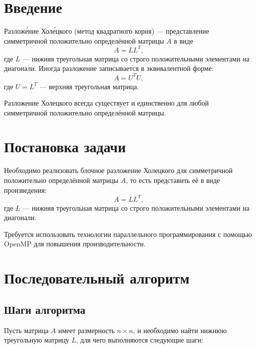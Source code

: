 \documentclass[12pt, russian]{extarticle}
\begin{document}

\begin{spacing}{1.5}

\tableofcontents
\thispagestyle{empty}
\newpage

\pagestyle{plain}
\setcounter{page}{3}


\section{Введение}

Разложе́ние Холе́цкого (метод квадратного корня) — представление симметричной положительно определённой матрицы \( A \) в виде
\[
A = LL^{T},
\]
где \( L \) — нижняя треугольная матрица со строго положительными элементами на диагонали. Иногда разложение записывается в эквивалентной форме:
\[
A = U^{T}U,
\]
где \( U = L^{T} \) — верхняя треугольная матрица.

Разложение Холецкого всегда существует и единственно для любой симметричной положительно определённой матрицы.

\newpage
\section{Постановка задачи}

Необходимо реализовать блочное разложение Холецкого для симметричной положительно определённой матрицы \( A \), то есть представить её в виде произведения:
\[
A = LL^{T},
\]
где \( L \) — нижняя треугольная матрица со строго положительными элементами на диагонали.

Требуется использовать технологии параллельного программирования с помощью OpenMP для повышения производительности.


\newpage
\section{Последовательный алгоритм}

\subsection*{Шаги алгоритма}

Пусть матрица \( A \) имеет размерность \( n \times n \), и необходимо найти нижнюю треугольную матрицу \( L \), для чего выполняются следующие шаги:


\end{spacing}
\end{document}
